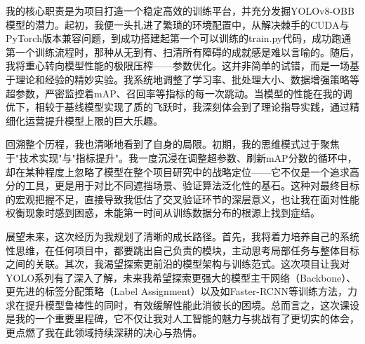 \documentclass[12pt, a4paper]{report}
\begin{document}
我的核心职责是为项目打造一个稳定高效的训练平台，并充分发掘YOLOv8-OBB模型的潜力。起初，我便一头扎进了繁琐的环境配置中，从解决棘手的CUDA与PyTorch版本兼容问题，到成功搭建起第一个可以训练的train.py代码，成功跑通第一个训练流程时，那种从无到有、扫清所有障碍的成就感是难以言喻的。随后，我将重心转向模型性能的极限压榨——参数优化。这并非简单的试错，而是一场基于理论和经验的精妙实验。我系统地调整了学习率、批处理大小、数据增强策略等超参数，严密监控着mAP、召回率等指标的每一次跳动。当模型的性能在我的调优下，相较于基线模型实现了质的飞跃时，我深刻体会到了理论指导实践，通过精细化运营提升模型上限的巨大乐趣。

回溯整个历程，我也清晰地看到了自身的局限。初期，我的思维模式过于聚焦于"技术实现"与"指标提升"。我一度沉浸在调整超参数、刷新mAP分数的循环中，却在某种程度上忽略了模型在整个项目研究中的战略定位——它不仅是一个追求高分的工具，更是用于对比不同遮挡场景、验证算法泛化性的基石。这种对最终目标的宏观把握不足，直接导致我低估了交叉验证环节的深层意义，也让我在面对性能权衡现象时感到困惑，未能第一时间从训练数据分布的根源上找到症结。

展望未来，这次经历为我规划了清晰的成长路径。首先，我将着力培养自己的系统性思维，在任何项目中，都要跳出自己负责的模块，主动思考局部任务与整体目标之间的关联。其次，我渴望探索更前沿的模型架构与训练范式。这次项目让我对YOLO系列有了深入了解，未来我希望探索更强大的模型主干网络（Backbone）、更先进的标签分配策略（Label Assignment）以及如Faster-RCNN等训练方法，力求在提升模型鲁棒性的同时，有效缓解性能此消彼长的困境。总而言之，这次课设是我的一个重要里程碑，它不仅让我对人工智能的魅力与挑战有了更切实的体会，更点燃了我在此领域持续深耕的决心与热情。

\vfill
\end{document}
